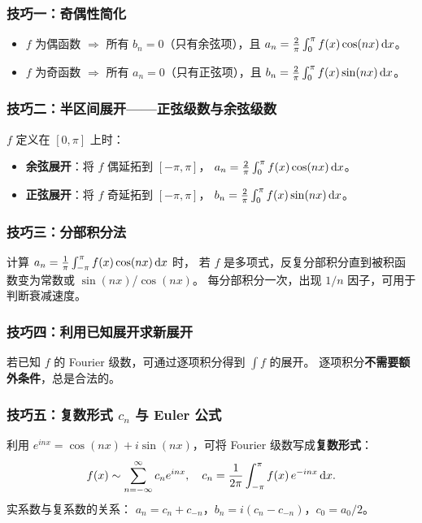 \documentclass{ctexart}
\begin{document}
\subsubsection*{技巧一：奇偶性简化}
\begin{itemize}
  \item $f$ 为偶函数 $\Rightarrow$ 所有 $b_n = 0$（只有余弦项），且
    $a_n = \frac{2}{\pi}\int_0^\pi f(x)\cos(nx) \,\mathrm{d} x$。
  \item $f$ 为奇函数 $\Rightarrow$ 所有 $a_n = 0$（只有正弦项），且
    $b_n = \frac{2}{\pi}\int_0^\pi f(x)\sin(nx) \,\mathrm{d} x$。
\end{itemize}

\subsubsection*{技巧二：半区间展开——正弦级数与余弦级数}
$f$ 定义在 $[0,\pi]$ 上时：
\begin{itemize}
  \item \textbf{余弦展开}：将 $f$ 偶延拓到 $[-\pi,\pi]$，
    $a_n = \frac{2}{\pi}\int_0^\pi f(x)\cos(nx) \,\mathrm{d} x$。
  \item \textbf{正弦展开}：将 $f$ 奇延拓到 $[-\pi,\pi]$，
    $b_n = \frac{2}{\pi}\int_0^\pi f(x)\sin(nx) \,\mathrm{d} x$。
\end{itemize}

\subsubsection*{技巧三：分部积分法}
计算 $a_n = \frac{1}{\pi}\int_{-\pi}^\pi f(x)\cos(nx) \,\mathrm{d} x$ 时，
若 $f$ 是多项式，反复分部积分直到被积函数变为常数或 $\sin(nx)$/$\cos(nx)$。
每分部积分一次，出现 $1/n$ 因子，可用于判断衰减速度。

\subsubsection*{技巧四：利用已知展开求新展开}
若已知 $f$ 的 Fourier 级数，可通过逐项积分得到 $\int f$ 的展开。
逐项积分\textbf{不需要额外条件}，总是合法的。

\subsubsection*{技巧五：复数形式 $c_n$ 与 Euler 公式}
利用 $e^{inx} = \cos(nx) + i\sin(nx)$，可将 Fourier 级数写成\textbf{复数形式}：
\[
  f(x) \sim \sum_{n=-\infty}^{\infty} c_n e^{inx}, \quad
  c_n = \frac{1}{2\pi}\int_{-\pi}^{\pi} f(x)\,e^{-inx} \,\mathrm{d} x.
\]
实系数与复系数的关系：
$a_n = c_n + c_{-n}$，$b_n = i(c_n - c_{-n})$，$c_0 = a_0/2$。
\end{document}
